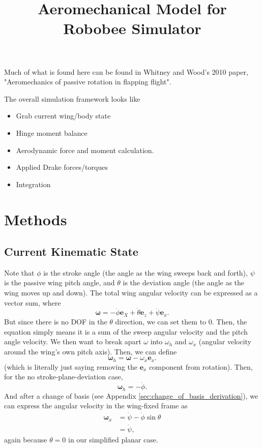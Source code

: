 \documentclass{article}
\title{Aeromechanical Model for Robobee Simulator}
\author{}
\date{}
\begin{document}
\maketitle
Much of what is found here can be found in Whitney and Wood's 2010 paper, "Aeromechanics of passive rotation in flapping flight". 

The overall simulation framework looks like 
\begin{itemize}
    \item Grab current wing/body state 
    \item Hinge moment balance 
    \item Aerodynamic force and moment calculation. 
    \item Applied Drake forces/torques 
    \item Integration 
\end{itemize}

\section{Methods} 
\subsection{Current Kinematic State}
Note that \(\phi\) is the stroke angle (the angle as the wing sweeps back and forth), \(\psi\) is the passive wing pitch angle, and \(\theta\) is the deviation angle (the angle as the wing moves up and down). The total wing angular velocity can be expressed as a vector sum, where 
\begin{equation}
    \label{eq:vector_sum}
    \boldsymbol{\omega} = -\dot{\phi} \mathbf{e}_X + \dot{\theta} \mathbf{e}_z + \dot{\psi} \mathbf{e}_x.
\end{equation}
But since there is no DOF in the \(\theta\) direction, we can set them to 0. 
Then, the equation simply means it is a sum of the sweep angular velocity and the pitch angle velocity. 
We then want to break apart \(\omega\) into \(\omega_h\) and \(\omega_x\) (angular velocity around the wing's own pitch axis). Then, we can define 
\begin{equation}
   \boldsymbol{\omega}_h = \boldsymbol{\omega} - {\omega}_x \mathbf{e}_x. 
\end{equation}
(which is literally just saying removing the \(\mathbf{e}_x\) component from rotation). Then, for the no stroke-plane-deviation case, 
\begin{equation}
    \boldsymbol{\omega}_h = -\dot{\phi}.
\end{equation}
And after a change of basis (see Appendix \ref{sec:change_of_basis_derivation}), we can express the angular velocity in the wing-fixed frame as
\begin{align}
    \boldsymbol{\omega}_x &= \dot{\psi} - \dot{\phi}\sin\theta \\ 
    &= \dot{\psi},
\end{align}
again because \(\theta = 0\) in our simplified planar case. 
\end{document}
